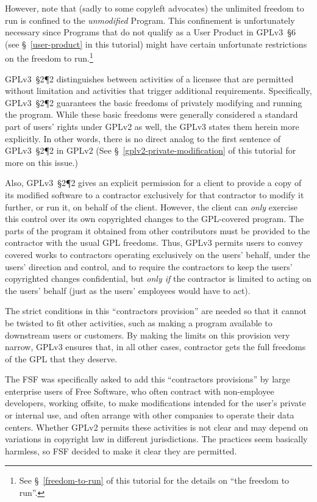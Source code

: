 However, note that (sadly to some copyleft advocates) the unlimited freedom
to run is confined to the \textit{unmodified} Program.  This confinement is
unfortunately necessary since Programs that do not qualify as a User Product
in GPLv3~\S6 (see \S~\ref{user-product} in this tutorial) might have certain
unfortunate restrictions on the freedom to run.\footnote{See
  \S~\ref{freedom-to-run} of this tutorial for the details on ``the freedom to
  run''.}

GPLv3~\S2\P2 distinguishes between activities of a licensee that are
permitted without limitation and activities that trigger additional
requirements.  Specifically, GPLv3~\S2\P2 guarantees the basic freedoms of
privately modifying and running the program.  While these basic freedoms were
generally considered a standard part of users' rights under GPLv2 as well,
the GPLv3 states them herein more explicitly.  In other words, there is no
direct analog to the first sentence of GPLv3~\S2\P2 in GPLv2
(See \S~\ref{gplv2-private-modification} of this tutorial for more on this issue.)

Also, GPLv3~\S2\P2 gives an explicit permission for a client to provide a
copy of its modified software to a contractor exclusively for that contractor
to modify it further, or run it, on behalf of the client.  However, the
client can \textit{only} exercise this control over its own copyrighted
changes to the GPL-covered program.  The parts of the program it obtained
from other contributors must be provided to the contractor with the usual GPL
freedoms.  Thus, GPLv3 permits users to convey covered works to contractors
operating exclusively on the users' behalf, under the users' direction and
control, and to require the contractors to keep the users' copyrighted
changes confidential, but \textit{only if} the contractor is limited to acting
on the users' behalf (just as the users' employees would have to act).

The strict conditions in this ``contractors provision'' are needed so that it
cannot be twisted to fit other activities, such as making a program available
to downstream users or customers.  By making the limits on this provision
very narrow, GPLv3 ensures that, in all other cases, contractor gets the
full freedoms of the GPL that they deserve.

The FSF was specifically asked to add this ``contractors provisions'' by
large enterprise users of Free Software, who often contract with non-employee
developers, working offsite, to make modifications intended for the user's
private or internal use, and often arrange with other companies to operate
their data centers.  Whether GPLv2 permits these activities is not clear and
may depend on variations in copyright law in different jurisdictions.  The
practices seem basically harmless, so FSF decided to make it clear they are
permitted.

